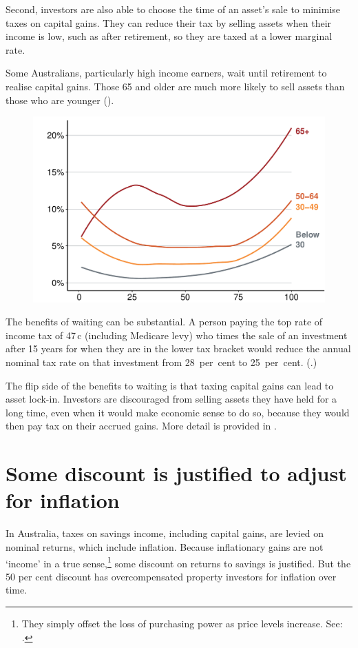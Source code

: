 Second, investors are also able to choose the time of an asset's sale to minimise taxes on capital gains. They can reduce their tax by selling assets when their income is low, such as after retirement, so they are taxed at a lower marginal rate. 

Some Australians, particularly high income earners, wait until retirement to realise capital gains. Those 65 and older are much more likely to sell assets than those who are younger ().

\begin{figure}
\label{fig:CGT-by-age-income}
\includegraphics[width=\columnwidth]{CGT-NG-atlas//CGT-by-age-taxable-income-1}
\end{figure}

The benefits of waiting can be substantial. A person paying the top rate of income tax of 47\,c (including Medicare levy) who times the sale of an investment after 15 years for when they are in the lower tax bracket would reduce the annual nominal tax rate on that investment from 28~per~cent to 25~per~cent. (.)

The flip side of the benefits to waiting is that taxing capital gains can lead to asset lock-in. Investors are discouraged from selling assets they have held for a long time, even when it would make economic sense to do so,  because they would then pay tax on their accrued gains. More detail is provided in .  


\section{Some discount is justified to adjust for inflation}
In Australia, taxes on savings income, including capital gains, are levied on nominal returns, which include inflation. Because inflationary gains are not `income' in a true sense,\footnote{They simply offset the loss of purchasing power as price levels increase. See: \textcite[][58]{Treasury2015ReThink}.}  some discount on returns to savings is justified. But the 50 per cent discount has overcompensated property investors for inflation over time. 

